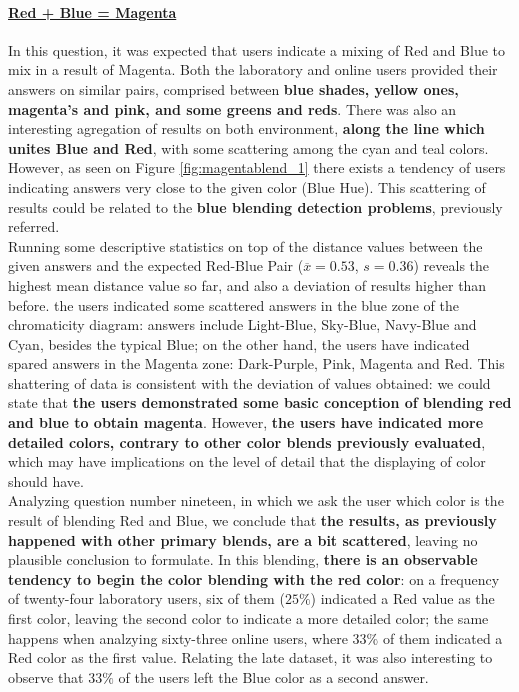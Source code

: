 \paragraph{\ul{Red + Blue = Magenta}}
%
In this question, it was expected that users indicate a mixing of Red and Blue to mix in a result of Magenta. Both the laboratory and online users provided their answers on similar pairs, comprised between \textbf{blue shades, yellow ones, magenta's and
pink, and some greens and reds}. There was also an interesting agregation of results on both environment, \textbf{along the line which unites Blue and Red}, with some scattering among the cyan and teal colors.  \\
However, as seen on Figure \ref{fig:magentablend_1} there exists a tendency of users indicating answers very close to the given color (Blue Hue). This scattering of results could be related to the \textbf{blue blending
detection problems}, previously referred. \\
%
Running some descriptive statistics on top of the distance values between the given answers and the expected Red-Blue Pair ($\overline{x} = 0.53$, $s = 0.36$) reveals the highest mean distance value so far, and also a deviation of results higher than before.
the users indicated some scattered answers in the blue zone of the chromaticity diagram: answers include Light-Blue, Sky-Blue, Navy-Blue and Cyan, besides the typical Blue; on the other hand, the users have indicated spared answers in the Magenta zone: Dark-Purple,
Pink, Magenta and Red. This shattering of data is consistent with the deviation of values obtained: we could state that \textbf{the users demonstrated some basic conception of blending red and blue to obtain magenta}. However, \textbf{the users have indicated more
detailed colors, contrary to other color blends previously evaluated}, which may have implications on the level of detail that the displaying of color should have. \\
%
Analyzing question number nineteen, in which we ask the user which color is the result of blending Red and Blue, we conclude that \textbf{the results, as previously happened with other primary blends, are a bit scattered}, leaving no plausible conclusion to formulate.
In this blending, \textbf{there is an observable tendency to begin the color blending with the red color}: on a frequency of twenty-four laboratory users, six of them ($25\%$) indicated a Red value as the first color, leaving the second color to indicate a
more detailed color; the same happens when analzying sixty-three online users, where $33\%$ of them indicated a Red color as the first value. Relating the late dataset, it was also interesting to observe that $33\%$ of the users left the Blue color as a second answer.
